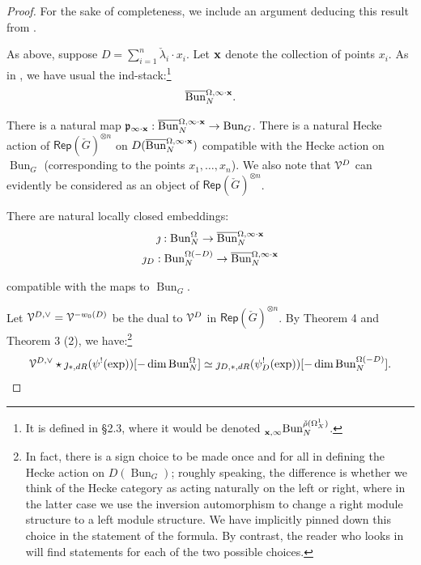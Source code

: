 \documentclass[reqno,11pt]{amsart}
\numberwithin{equation}{subsection}
\theoremstyle{remark}
\newcommand{\presub}[1]{\prescript{}{#1}}
\newcommand{\sV}{{\EuScript V}}
\newcommand{\fp}{{\mathfrak p}}
\newcommand{\on}{\operatorname}
\newcommand{\ol}[1]{\overline{#1}{}}
\newcommand{\Rep}{\mathsf{Rep}}
\newcommand{\Bun}{\on{Bun}}
\begin{document}
\begin{proof}

For the sake of completeness, we include an argument deducing
this result from \cite{fgv}.

As above, suppose $D = \sum_{i=1}^n \check{\lambda}_i \cdot x_i$.
Let $\bold{x}$ denote the collection of points $x_i$.
As in \cite{fgv}, we have usual the 
ind-stack:\footnote{It is defined in \cite{fgv} \S 2.3, where it would be 
denoted $\presub{\bold{x},\infty}{\Bun}_N^{\check{\rho}(\Omega_X^1)}$.}
%
\[
\ol{\Bun}_N^{\Omega,\infty\cdot \bold{x}}.
\]

\noindent
There is a natural map $\fp_{\infty\cdot \bold{x}}: 
\ol{\Bun}_N^{\Omega,\infty\cdot \bold{x}} \to \Bun_G$.
There is a natural Hecke action of $\Rep(\check{G})^{\otimes n}$
on $D(\ol{\Bun}_N^{\Omega,\infty\cdot \bold{x}})$ compatible
with the Hecke action on $\Bun_G$ (corresponding to the
points $x_1,\ldots,x_n$). We also note that $\sV^D$ can
evidently be considered as an object of $\Rep(\check{G})^{\otimes n}$.

There are natural locally closed embeddings:
%
\[
\begin{gathered}
\jmath:\Bun_N^{\Omega} \to \ol{\Bun}_N^{\Omega,\infty\cdot \bold{x}} \\
\jmath_D:\Bun_N^{\Omega(-D)} \to \ol{\Bun}_N^{\Omega,\infty\cdot \bold{x}}
\end{gathered}
\]

\noindent compatible with the maps to $\Bun_G$.

Let $\sV^{D,\vee} = \sV^{-w_0(D)}$ 
be the dual to $\sV^D$ in $\Rep(\check{G})^{\otimes n}$.
By \cite{fgv} Theorem 4 and Theorem 3 (2), we have:\footnote{In fact,
there is a sign choice to be made once and for all in defining the Hecke
action on $D(\Bun_G)$; roughly speaking, the difference is whether
we think of the Hecke category as acting naturally on the left or right,
where in the latter case we use the inversion automorphism to change
a right module structure to a left module structure. 
We have implicitly pinned down this choice in the statement of the formula.
By contrast, the reader who looks in \cite{fgv} will find 
statements for each of the two possible choices.}
%
\[
\sV^{D,\vee} 
\star \jmath_{*,dR}(\psi^!(\exp))[-\dim \Bun_N^{\Omega}] \simeq 
\jmath_{D,*,dR}(\psi_D^!(\exp))[-\dim \Bun_N^{\Omega(-D)}].
\]


\end{proof}
\end{document}
